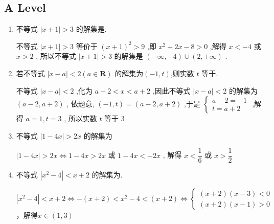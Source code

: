 \subsection*{A Level}
\begin{enumerate}
    \item 不等式 $\left| {x + 1}\right|  > 3$ 的解集是. 
    \begin{jieda}
        不等式 $\left| {x + 1}\right|  > 3$ 等价于 ${\left( x + 1\right) }^{2} > 9$ ,即 ${x}^{2} + {2x} - 8 > 0$ ,解得 $x <  - 4$ 或 $x > 2$ , 所以不等式 $\left| {x + 1}\right|  > 3$ 的解集是 $\left( {-\infty , - 4}\right)  \cup  \left( {2, + \infty }\right)$ .
    \end{jieda}
    
    \item 若不等式 $\left| {x - a}\right|  < 2\left( {a \in  \mathbf{R}}\right)$ 的解集为$(-1, t)$,则实数 $t$ 等于. 
    \begin{jieda}
        不等式 $\left| {x - a}\right|  < 2$ ,化为 $a - 2 < x < a + 2$ ,因此不等式 $\left| {x - a}\right|  < 2$ 的解集为 $\left( {a - 2,a + 2}\right)$ , 依题意, $\left( {-1,t}\right)  = \left( {a - 2,a + 2}\right)$ ,于是 $\left\{  \begin{array}{l} a - 2 =  - 1 \\  t = a + 2 \end{array}\right.$ ,解得 $a = 1,t = 3$ , 所以实数 $t$ 等于 3
    \end{jieda}
    \item 不等式 $\left| {1 - {4x}}\right|  > {2x}$ 的解集为 
    \begin{jieda}
        $\left| {1 - {4x}}\right|  > {2x} \Longleftrightarrow 1 - {4x} > {2x}$ 或 $1 - {4x} <  - {2x}$ , 解得 $x < \dfrac{1}{6}$ 或 $x > \dfrac{1}{2}$
    \end{jieda}
    \item 不等式 $\left| {{x}^{2} - 4}\right|  < x + 2$ 的解集为. 
    \begin{jieda}
        $\left| {{x}^{2} - 4}\right|  < x + 2 \Longleftrightarrow -(x+2) < x^2-4 < (x+2) \Longleftrightarrow \left\{\begin{array}{l}
             (x+2)(x-3) < 0  \\
             (x+2)(x-1) > 0
        \end{array}\right.$，解得$ x \in (1,3)$
    \end{jieda}

\end{enumerate}

